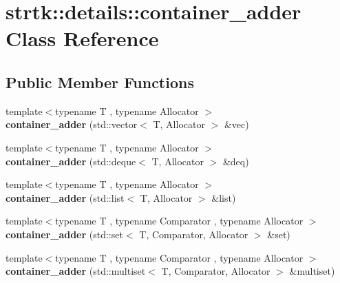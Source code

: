 \hypertarget{classstrtk_1_1details_1_1container__adder}{\section{strtk\-:\-:details\-:\-:container\-\_\-adder Class Reference}
\label{classstrtk_1_1details_1_1container__adder}
}
\subsection*{Public Member Functions}
\begin{DoxyCompactItemize}
\item 
\hypertarget{classstrtk_1_1details_1_1container__adder_a53db8b431a36feeba1e6ffe56b45fa99}{{\footnotesize template$<$typename T , typename Allocator $>$ }\\{\bfseries container\-\_\-adder} (std\-::vector$<$ T, Allocator $>$ \&vec)}\label{classstrtk_1_1details_1_1container__adder_a53db8b431a36feeba1e6ffe56b45fa99}

\item 
\hypertarget{classstrtk_1_1details_1_1container__adder_aa3419a65431adeef1036f1c46d638597}{{\footnotesize template$<$typename T , typename Allocator $>$ }\\{\bfseries container\-\_\-adder} (std\-::deque$<$ T, Allocator $>$ \&deq)}\label{classstrtk_1_1details_1_1container__adder_aa3419a65431adeef1036f1c46d638597}

\item 
\hypertarget{classstrtk_1_1details_1_1container__adder_a9b961cbb6aec9fde7d4f6e47dd96b260}{{\footnotesize template$<$typename T , typename Allocator $>$ }\\{\bfseries container\-\_\-adder} (std\-::list$<$ T, Allocator $>$ \&list)}\label{classstrtk_1_1details_1_1container__adder_a9b961cbb6aec9fde7d4f6e47dd96b260}

\item 
\hypertarget{classstrtk_1_1details_1_1container__adder_a23305833ea58aa9e7fcaae10e81d3dde}{{\footnotesize template$<$typename T , typename Comparator , typename Allocator $>$ }\\{\bfseries container\-\_\-adder} (std\-::set$<$ T, Comparator, Allocator $>$ \&set)}\label{classstrtk_1_1details_1_1container__adder_a23305833ea58aa9e7fcaae10e81d3dde}

\item 
\hypertarget{classstrtk_1_1details_1_1container__adder_aa3f0e628ab1475ac802d1a9d88e51c6c}{{\footnotesize template$<$typename T , typename Comparator , typename Allocator $>$ }\\{\bfseries container\-\_\-adder} (std\-::multiset$<$ T, Comparator, Allocator $>$ \&multiset)}\label{classstrtk_1_1details_1_1container__adder_aa3f0e628ab1475ac802d1a9d88e51c6c}


\end{DoxyCompactItemize}
